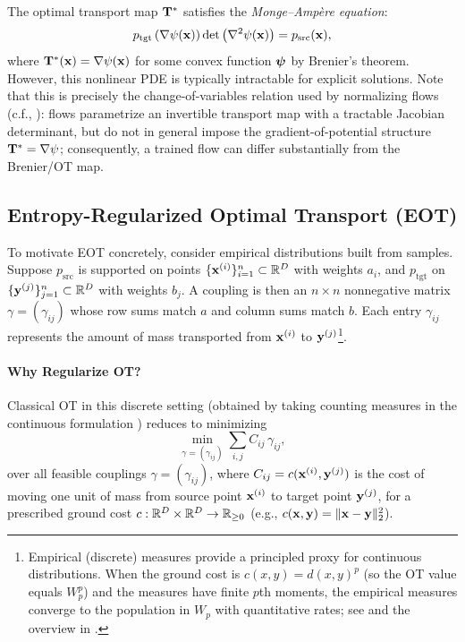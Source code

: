 The optimal transport map ${\mathbf{T}}^*$ satisfies the \emph{Monge–Ampère equation}:
\begin{equation}\label{eq:monge-ampere}
    p_{\mathrm{tgt}}\left(\nabla \psi({\mathbf{x}})\right) \det\left(\nabla^2 \psi({\mathbf{x}})\right) = p_{\mathrm{src}}({\mathbf{x}}),
\end{equation}
where ${\mathbf{T}}^*({\mathbf{x}}) = \nabla \psi({\mathbf{x}})$ for some convex function ${\bm{\psi}}$ by Brenier’s theorem. However, this nonlinear PDE is typically intractable for explicit solutions. Note that this is precisely the change-of-variables relation used by normalizing flows (c.f., ): flows parametrize an invertible transport map with a tractable Jacobian determinant, but do not in general impose the gradient-of-potential structure ${\mathbf{T}}^*=\nabla\psi$; consequently, a trained flow can differ substantially from the Brenier/OT map.





\subsection{Entropy-Regularized Optimal Transport (EOT)}

To motivate EOT concretely, consider empirical distributions built from samples. 
Suppose $p_{\mathrm{src}}$ is supported on points $\{{\mathbf{x}}^{(i)}\}_{i=1}^n \subset \mathbb{R}^D$ with weights $a_i$, 
and $p_{\mathrm{tgt}}$ on $\{{\mathbf{y}}^{(j)}\}_{j=1}^n \subset \mathbb{R}^D$ with weights $b_j$. 
A coupling is then an $n\times n$ nonnegative matrix $\gamma=(\gamma_{ij})$ whose row sums match $a$ and column sums match $b$. 
Each entry $\gamma_{ij}$ represents the amount of mass transported from ${\mathbf{x}}^{(i)}$ to ${\mathbf{y}}^{(j)}$\footnote{Empirical (discrete) measures provide a principled proxy for continuous distributions. 
When the ground cost is $c(x,y)=d(x,y)^p$ (so the OT value equals $W_p^p$) and the measures have finite $p$th moments, the empirical measures converge to the population in $W_p$ with quantitative rates; see \citet{fournier2015rate} and the overview in \citet{peyre2019computational}.}.

\paragraph{Why Regularize OT?}
Classical OT in this discrete setting (obtained by taking counting measures in the continuous formulation ) reduces to minimizing
\[
\min_{\gamma=(\gamma_{ij})}\sum_{i,j} C_{ij}\,\gamma_{ij},
\]
over all feasible couplings $\gamma=(\gamma_{ij})$, 
where $C_{ij} = c({\mathbf{x}}^{(i)},{\mathbf{y}}^{(j)})$ is the cost of moving one unit of mass from source point ${\mathbf{x}}^{(i)}$ to target point ${\mathbf{y}}^{(j)}$, for a prescribed ground cost 
$c:\mathbb{R}^D\times\mathbb{R}^D\to\mathbb{R}_{\ge 0}$ (e.g., $c({\mathbf{x}},{\mathbf{y}})=\|{\mathbf{x}}-{\mathbf{y}}\|_2^2$).

